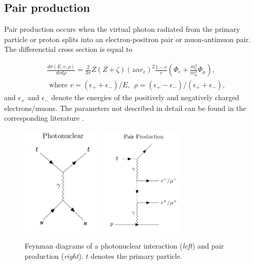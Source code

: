 \subsection{Pair production}
\label{subsec:pairprod}
Pair production occurs when the virtual photon radiated from the primary particle or proton splits into an electron-positron pair or muon-antimuon pair. The differenctial cross section is equal to
 
\begin{equation}
\begin{split}
&\frac{d\sigma(E,v,\rho)}{dvd\rho} = \frac{2}{3\pi} Z(Z+\zeta)(z \alpha r_e)^2 \frac{1-v}{v} \left(\Phi_e + \frac{m_e^2}{m_\mu^2} \Phi_\mu \right), \\
& \textrm{ where \ \ } v = (\epsilon_+ + \epsilon_-)/E, \ \ \rho = (\epsilon_+ - \epsilon_-)/(\epsilon_+ + \epsilon_-),
\end{split}
\end{equation}
and $\epsilon_+$ and $\epsilon_-$ denote the energies of the positively and negatively charged electrons/muons. The parameters not described in detail can be found in the corresponding literature \cite{Chirkin:2004hz}.

\begin{figure}
\centering
\includegraphics[width = 0.35\textwidth]{chapter4/img/Feynman_PhotoNuclear_2.png}
\includegraphics[width = 0.35\textwidth]{chapter4/img/Feynman_PairProduction_2.png}
\caption{Feynman diagrams of a photonuclear interaction (\textit{left}) and pair production (\textit{right}). $t$ denotes the primary particle.}
\label{fig:feynmannuclpairprod}
\end{figure}

